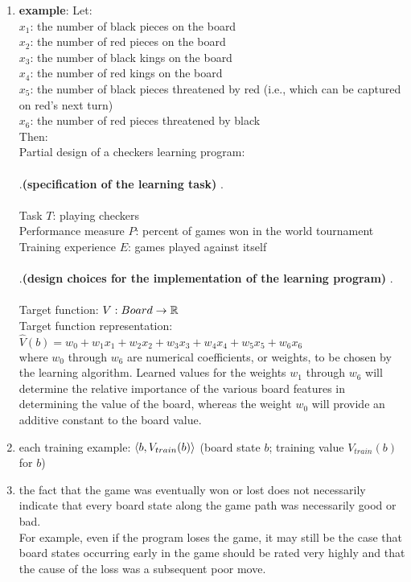 \begin{enumerate}
    \item[] \textbf{example}: Let:
    \\
    $x_1$: the number of black pieces on the board 
    \\
    $x_2$: the number of red pieces on the board 
    \\
    $x_3$: the number of black kings on the board 
    \\
    $x_4$: the number of red kings on the board 
    \\
    $x_5$: the number of black pieces threatened by red (i.e., which can be captured on red's next turn) 
    \\
    $x_6$: the number of red pieces threatened by black 
    \vspace{0.3cm} \noindent
    \\
    Then: 
    \\
    Partial design of a checkers learning program: 
    \\ \\
    .\hfill \textbf{(specification of the learning task)} \hfill.
    \\ \\
    Task $T$: playing checkers 
    \\
    Performance measure $P$: percent of games won in the world tournament 
    \\
    Training experience $E$: games played against itself 
    \\ \\
    .\hfill \textbf{(design choices for the implementation of the learning program)} \hfill.
    \\ \\
    Target function: $V: Board \to \mathbb{R}$ 
    \\
    Target function representation: $\hat{V}(b) = w_0 + w_1x_1 + w_2x_2 + w_3x_3 + w_4x_4 + w_5x_5 + w_6x_6$ 
    \\
    where $w_0$ through $w_6$ are numerical coefficients, or weights, to be chosen by the learning algorithm. Learned values for the weights $w_1$ through $w_6$ will determine the relative importance of the various board features in determining the value of the board, whereas the weight $w_0$ will provide an additive constant to the board value. 
    
    \item each training example: $\langle b, V_{train}(b)\rangle$
        \hfill (board state $b$; training value $V_{train}(b)$ for $b$)

    \item the fact that the game was eventually won or lost does not necessarily indicate that every board state along the game path was necessarily good or bad.
    \hfill \cite{ml/book/Machine-Learning/Tom-M-Mitchell}
    \\
    For example, even if the program loses the game, it may still be the case that board states occurring early in the game should be rated very highly and that the cause of the loss was a subsequent poor move. 
    \hfill \cite{ml/book/Machine-Learning/Tom-M-Mitchell}


\end{enumerate}
